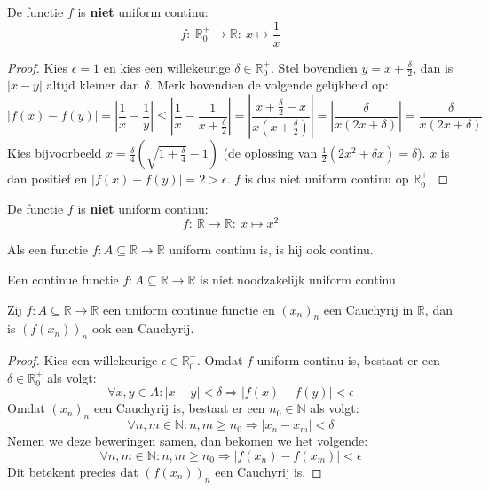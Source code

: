 \documentclass[main.tex]{subfiles}
\begin{document}
\begin{vb}
  De functie $f$ is \textbf{niet} uniform continu:
  \[ f:\ \mathbb{R}_{0}^{+} \rightarrow \mathbb{R}:\ x \mapsto \frac{1}{x} \]

  \begin{proof}
    Kies $\epsilon = 1$ en kies een willekeurige $\delta \in \mathbb{R}_{0}^{+}$.
    Stel bovendien $y = x + \frac{\delta}{2}$, dan is $|x-y|$ altijd kleiner dan $\delta$.
    Merk bovendien de volgende gelijkheid op:
    \[ |f(x)-f(y)| = \left| \frac{1}{x} - \frac{1}{y} \right| \le \left| \frac{1}{x} - \frac{1}{x + \frac{\delta}{2}} \right| = \left| \frac{x+\frac{\delta}{2}-x}{x(x+\frac{\delta}{2})}\right| = \left| \frac{\delta}{x(2x+\delta)} \right| = \frac{\delta}{x(2x+\delta)} \]
    Kies bijvoorbeeld $x = \frac{\delta}{4}\left(\sqrt{1+\frac{\delta}{4}}-1\right)$ (de oplossing van $\frac{1}{2}(2x^{2}+\delta x) = \delta$).
    $x$ is dan positief en $|f(x)-f(y)| = 2 > \epsilon$.
    $f$ is dus niet uniform continu op $\mathbb{R}_{0}^{+}$.
  \end{proof}
\end{vb}


\begin{vb}
  De functie $f$ is \textbf{niet} uniform continu:
  \[ f:\ \mathbb{R} \rightarrow \mathbb{R}:\ x \mapsto x^{2}\]
\end{vb}

\begin{st}
  \label{st:uniform-continu-dan-ook-gewoon-continu}
  Als een functie $f: A \subseteq \mathbb{R} \rightarrow \mathbb{R}$ uniform continu is, is hij ook continu.
\end{st}

\begin{tvb}
  Een continue functie $f: A \subseteq \mathbb{R} \rightarrow \mathbb{R}$ is niet noodzakelijk uniform continu
\end{tvb}

\begin{bpr}
  \label{pr:uniform-continue-functie-behoudt-cauchy}
  Zij $f: A \subseteq \mathbb{R} \rightarrow \mathbb{R}$ een uniform continue functie en $(x_{n})_{n}$ een Cauchyrij in $\mathbb{R}$, dan is $(f(x_{n}))_{n}$ ook een Cauchyrij.

  \begin{proof}
    Kies een willekeurige $\epsilon \in \mathbb{R}_{0}^{+}$.
    Omdat $f$ uniform continu is, bestaat er een $\delta \in \mathbb{R}_{0}^{+}$ als volgt:
    \[ \forall x,y \in A: |x-y| < \delta \Rightarrow |f(x)-f(y)| < \epsilon \]
    Omdat $(x_{n})_{n}$ een Cauchyrij is, bestaat er een $n_{0}\in \mathbb{N}$ als volgt:
    \[ \forall n,m \in \mathbb{N}: n,m \ge n_{0} \Rightarrow |x_{n}-x_{m}| < \delta \]
    Nemen we deze beweringen samen, dan bekomen we het volgende:
    \[ \forall n,m \in \mathbb{N}: n,m \ge n_{0} \Rightarrow |f(x_{n})-f(x_{m})| < \epsilon \]
    Dit betekent precies dat $(f(x_{n}))_{n}$ een Cauchyrij is.
  \end{proof}
\end{bpr}
\end{document}
